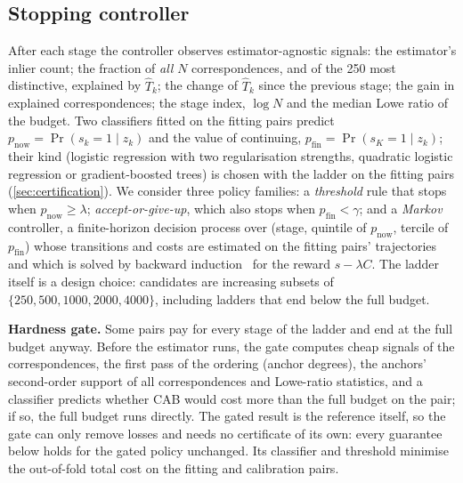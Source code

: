 \documentclass[10pt,twocolumn,letterpaper]{article}
\newcommand{\method}{CAB\xspace}
\newcommand{\paragraphb}[1]{\vspace{2pt}\noindent\textbf{#1}\hspace{0.4em}}
\begin{document}
\subsection{Stopping controller}
\label{sec:controller}
After each stage the controller observes estimator-agnostic signals: the estimator's inlier count; the fraction of \emph{all} $N$ correspondences, and of the 250 most distinctive, explained by $\hat T_k$; the change of $\hat T_k$ since the previous stage; the gain in explained correspondences; the stage index, $\log N$ and the median Lowe ratio of the budget.
Two classifiers fitted on the fitting pairs predict $p_\text{now}=\Pr(s_k{=}1\mid z_k)$ and the value of continuing, $p_\text{fin}=\Pr(s_K{=}1\mid z_k)$; their kind (logistic regression with two regularisation strengths, quadratic logistic regression or gradient-boosted trees) is chosen with the ladder on the fitting pairs (\cref{sec:certification}).
We consider three policy families: a \emph{threshold} rule that stops when $p_\text{now}\ge\lambda$; \emph{accept-or-give-up}, which also stops when $p_\text{fin}<\gamma$; and a \emph{Markov} controller, a finite-horizon decision process over (stage, quintile of $p_\text{now}$, tercile of $p_\text{fin}$) whose transitions and costs are estimated on the fitting pairs' trajectories and which is solved by backward induction~\cite{puterman1994mdp} for the reward $s-\lambda C$.
The ladder itself is a design choice: candidates are increasing subsets of $\{250,500,1000,2000,4000\}$, including ladders that end below the full budget.

\paragraphb{Hardness gate.}
Some pairs pay for every stage of the ladder and end at the full budget anyway.
Before the estimator runs, the gate computes cheap signals of the correspondences, the first pass of the ordering (anchor degrees), the anchors' second-order support of all correspondences and Lowe-ratio statistics, and a classifier predicts whether \method would cost more than the full budget on the pair; if so, the full budget runs directly.
The gated result is the reference itself, so the gate can only remove losses and needs no certificate of its own: every guarantee below holds for the gated policy unchanged.
Its classifier and threshold minimise the out-of-fold total cost on the fitting and calibration pairs.
\end{document}
